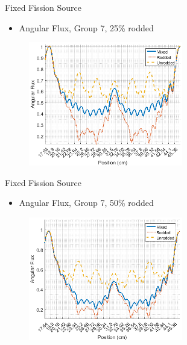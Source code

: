 
\begin{frame}[t]{Fixed Fission Source}

\begin{itemize}
  \item Angular Flux, Group 7, 25\% rodded
\end{itemize}
\begin{figure}[H]
    \centering
    \includegraphics[width=0.6\textwidth]{../figs/1dmoc-25mix-angflux7.png}
\end{figure}

\end{frame}


\begin{frame}[t]{Fixed Fission Source}

\begin{itemize}
  \item Angular Flux, Group 7, 50\% rodded
\end{itemize}
\begin{figure}[H]
  \centering
  \includegraphics[width=0.6\textwidth]{../figs/1dmoc-50mix-angflux7.png}
\end{figure}

\end{frame}

